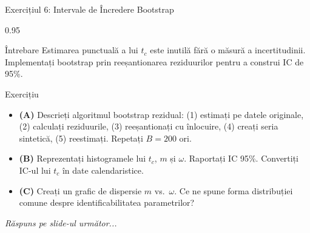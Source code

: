 \documentclass[9pt, aspectratio=169, t]{beamer}
\begin{document}
\begin{frame}{Exercițiul 6: Intervale de Încredere Bootstrap}
    \begin{cminipage}{0.95\textwidth}
    \begin{alertblock}{Întrebare}
        Estimarea punctuală a lui $t_c$ este inutilă fără o măsură a incertitudinii.
        Implementați bootstrap prin reeșantionarea reziduurilor pentru a construi IC de 95\%.
    \end{alertblock}

    \vspace{0.1cm}

    \begin{block}{Exercițiu}
        \begin{itemize}\setlength{\itemsep}{2pt}
            \item \textcolor{MainBlue}{\textbf{(A)}} Descrieți algoritmul bootstrap rezidual: (1) estimați pe datele originale, (2) calculați reziduurile, (3) reeșantionați cu înlocuire, (4) creați seria sintetică, (5) reestimați. Repetați $B = 200$ ori.
            \item \textcolor{MainBlue}{\textbf{(B)}} Reprezentați histogramele lui $t_c$, $m$ și $\omega$. Raportați IC 95\%. Convertiți IC-ul lui $t_c$ în date calendaristice.
            \item \textcolor{MainBlue}{\textbf{(C)}} Creați un grafic de dispersie $m$ vs.\ $\omega$. Ce ne spune forma distribuției comune despre identificabilitatea parametrilor?
        \end{itemize}
    \end{block}

    \vspace{0.1cm}

    \begin{center}
        \textit{Răspuns pe slide-ul următor...}
    \end{center}
    \end{cminipage}
\end{frame}
\end{document}
